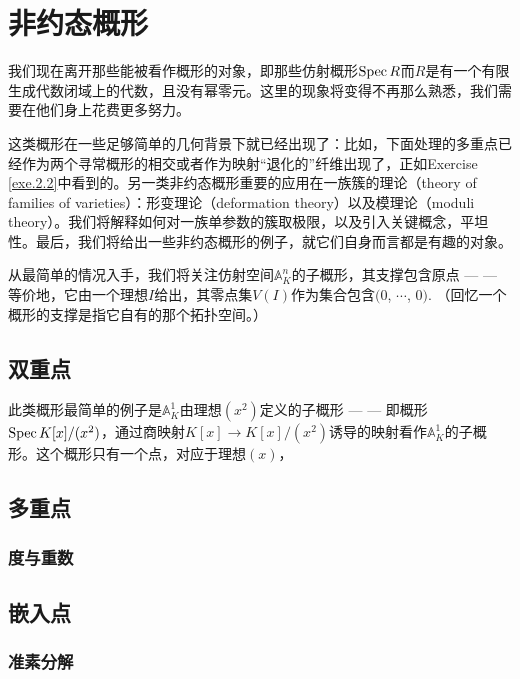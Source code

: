 \section{非约态概形}

我们现在离开那些能被看作概形的对象，即那些仿射概形$\operatorname{Spec} R$而$R$是有一个有限生成代数闭域上的代数，且没有幂零元。这里的现象将变得不再那么熟悉，我们需要在他们身上花费更多努力。

这类概形在一些足够简单的几何背景下就已经出现了：比如，下面处理的多重点已经作为两个寻常概形的相交或者作为映射“退化的”纤维出现了，正如Exercise \ref{exe.2.2}中看到的。另一类非约态概形重要的应用在一族簇的理论（theory of families of varieties）：形变理论（deformation theory）以及模理论（moduli theory）。我们将解释如何对一族单参数的簇取极限，以及引入关键概念，平坦性。最后，我们将给出一些非约态概形的例子，就它们自身而言都是有趣的对象。

从最简单的情况入手，我们将关注仿射空间$\mathbb{A}_K^n$的子概形，其支撑包含原点 --- --- 等价地，它由一个理想$I$给出，其零点集$V(I)$作为集合包含$(0$, $\cdots$, $0)$. （回忆一个概形的支撑是指它自有的那个拓扑空间。）

\subsection{双重点}

\begin{exa}
	此类概形最简单的例子是$\mathbb{A}_K^1$由理想$(x^2)$定义的子概形 --- --- 即概形$\operatorname{Spec} K[x]/(x^2)$，通过商映射$K[x]\to K[x]/(x^2)$诱导的映射看作$\mathbb{A}_K^1$的子概形。这个概形只有一个点，对应于理想$(x)$，
\end{exa}

\subsection{多重点}

\subsubsection*{度与重数}

\subsection{嵌入点}

\subsubsection*{准素分解}

